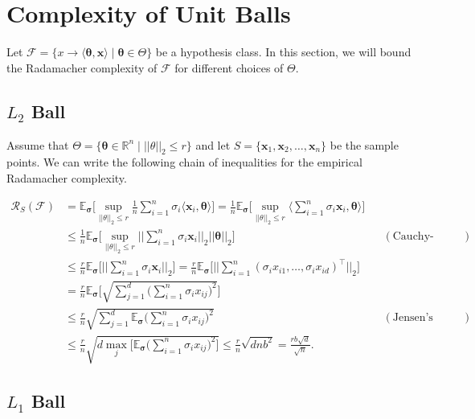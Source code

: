 \documentclass[]{article}
\newcommand{\bx}{\mathbf{x}}
\newcommand{\btheta}{{\boldsymbol{\theta}}}
\newcommand{\bsigma}{{\boldsymbol{\sigma}}}
\newcommand{\cF}{\mathcal{F}}
\newcommand{\Rad}{\mathcal{R}}
\newcommand{\R}{\mathbb{R}}
\newcommand{\E}{\mathbb{E}}
\begin{document}
	\section{Complexity of Unit Balls}
	
	Let $\cF = \{x\to \langle \btheta, \bx \rangle\;|\;\btheta \in \Theta\}$ be a hypothesis class. In this section, we will bound the Radamacher complexity of $\cF$ for different choices of $\Theta$.
	
	\subsection{$L_2$ Ball}
	
	Assume that $\Theta = \{\btheta \in \R^n \;|\; ||\theta||_2 \leq r\}$ and let $S = \{\bx_1, \bx_2, \dots, \bx_n\}$ be the sample points. We can write the following chain of inequalities for the empirical Radamacher complexity.
	
	\begin{align*}
	\Rad_S(\cF) &= \E_{\bsigma}\Big[\sup_{||\theta||_2 \leq r} \frac{1}{n}\sum_{i = 1}^{n} \sigma_i \langle \bx_i, \btheta\rangle\Big]
	= \frac{1}{n} \E_{\bsigma} \Big[\sup_{||\theta||_2 \leq r} \Big\langle \sum_{i = 1}^{n} \sigma_i \bx_i, \btheta\Big\rangle\Big]\\		
	&\leq \frac{1}{n} \E_{\bsigma} \Big[\sup_{||\theta||_2 \leq r} \big|\big| \sum_{i = 1}^{n} \sigma_i \bx_i\big|\big|_2 \big|\big|\btheta\big|\big|_2\Big] && (\text{Cauchy-Schwartz})\\		
	&\leq \frac{r}{n} \E_{\bsigma} \Big[ \big|\big| \sum_{i = 1}^{n} \sigma_i \bx_i\big|\big|_2 \Big] 
	= \frac{r}{n} \E_{\bsigma} \Big[ \big|\big| \sum_{i = 1}^{n} (\sigma_i x_{i1}, \dots, \sigma_i x_{id})^\top \big|\big|_2 \Big]\\
	&= \frac{r}{n} \E_{\bsigma} \Bigg[ \sqrt{\sum_{j = 1}^{d} \Big(\sum_{i = 1}^{n} \sigma_i x_{ij}\Big)^2} \Bigg] \\
	&\leq \frac{r}{n}  \sqrt{  \sum_{j = 1}^{d} \E_{\bsigma}\Big(\sum_{i = 1}^{n} \sigma_i x_{ij}\Big)^2} && (\text{Jensen's Inequality})\\
	&\leq \frac{r}{n}  \sqrt{  d \max_j \Big[ \E_{\bsigma}\Big(\sum_{i = 1}^{n} \sigma_i x_{ij} \Big)^2 \Big]}
	 \leq \frac{r}{n}\sqrt{dnb^2} = \frac{rb\sqrt{d}}{\sqrt{n}}.
	\end{align*}


	\subsection{$L_1$ Ball}
	
\end{document}
